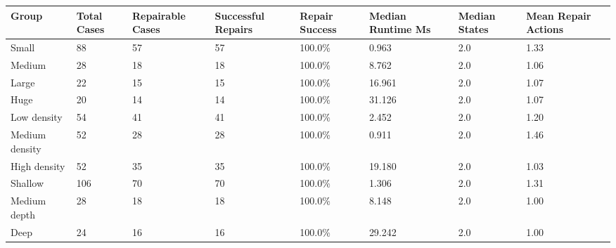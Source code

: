 \begin{tabularx}{\linewidth}{@{}lXXXXXXX@{}}
\hline
Group & Total Cases & Repairable Cases & Successful Repairs & Repair Success & Median Runtime Ms & Median States & Mean Repair Actions \\
\hline
Small & 88 & 57 & 57 & 100.0\% & 0.963 & 2.0 & 1.33 \\
Medium & 28 & 18 & 18 & 100.0\% & 8.762 & 2.0 & 1.06 \\
Large & 22 & 15 & 15 & 100.0\% & 16.961 & 2.0 & 1.07 \\
Huge & 20 & 14 & 14 & 100.0\% & 31.126 & 2.0 & 1.07 \\
Low density & 54 & 41 & 41 & 100.0\% & 2.452 & 2.0 & 1.20 \\
Medium density & 52 & 28 & 28 & 100.0\% & 0.911 & 2.0 & 1.46 \\
High density & 52 & 35 & 35 & 100.0\% & 19.180 & 2.0 & 1.03 \\
Shallow & 106 & 70 & 70 & 100.0\% & 1.306 & 2.0 & 1.31 \\
Medium depth & 28 & 18 & 18 & 100.0\% & 8.148 & 2.0 & 1.00 \\
Deep & 24 & 16 & 16 & 100.0\% & 29.242 & 2.0 & 1.00 \\
\hline
\end{tabularx}
